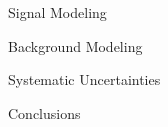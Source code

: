 \documentclass[pdf, 9pt]{beamer}
\begin{document}
  \begin{frame}{Signal Modeling}
  \end{frame}

  \begin{frame}{Background Modeling}
  \end{frame}

  \begin{frame}{Systematic Uncertainties}

  \end{frame}

  \begin{frame}{Conclusions}
  \end{frame}

\end{document}
